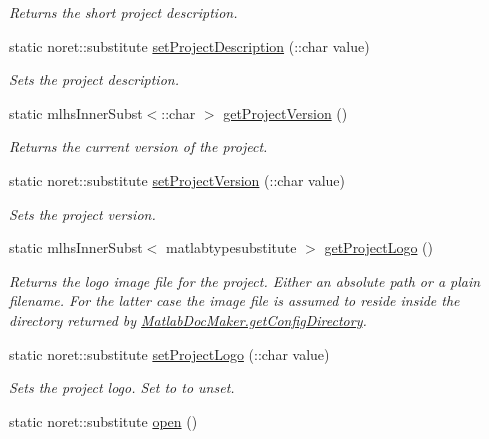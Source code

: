 \begin{DoxyCompactItemize}
\begin{DoxyCompactList}\small\item\em Returns the short project description. \end{DoxyCompactList}\item 
static noret\+::substitute \hyperlink{class_matlab_doc_maker_aa36d079ff377b0de42dd58c0154abc0d}{set\+Project\+Description} (\+::char value)
\begin{DoxyCompactList}\small\item\em Sets the project description. \end{DoxyCompactList}\item 
static mlhs\+Inner\+Subst$<$\+::char $>$ \hyperlink{class_matlab_doc_maker_a1070db754e27b70e775524e2392a1390}{get\+Project\+Version} ()
\begin{DoxyCompactList}\small\item\em Returns the current version of the project. \end{DoxyCompactList}\item 
static noret\+::substitute \hyperlink{class_matlab_doc_maker_a5cf2636bc8dac454f314847775fc9da7}{set\+Project\+Version} (\+::char value)
\begin{DoxyCompactList}\small\item\em Sets the project version. \end{DoxyCompactList}\item 
static mlhs\+Inner\+Subst$<$ matlabtypesubstitute $>$ \hyperlink{class_matlab_doc_maker_a80cf6644c2827176070ac768e1c07538}{get\+Project\+Logo} ()
\begin{DoxyCompactList}\small\item\em Returns the logo image file for the project. Either an absolute path or a plain filename. For the latter case the image file is assumed to reside inside the directory returned by \hyperlink{class_matlab_doc_maker_ac201c45057310993a26a114403254c41}{Matlab\+Doc\+Maker.\+get\+Config\+Directory}. \end{DoxyCompactList}\item 
static noret\+::substitute \hyperlink{class_matlab_doc_maker_a01cb613496ec3db0c68249d8af346ac4}{set\+Project\+Logo} (\+::char value)
\begin{DoxyCompactList}\small\item\em Sets the project logo. Set to \textquotesingle{} to unset. \end{DoxyCompactList}\item 
static noret\+::substitute \hyperlink{class_matlab_doc_maker_ac477800dc8332769ae7a542a49aa6d0c}{open} ()

\end{DoxyCompactItemize}
